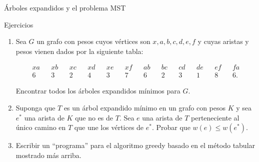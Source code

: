 \documentclass[11pt,spanish,makeidx]{amsbook}
\theoremstyle{definition}
\theoremstyle{remark}
\begin{document}
\begin{section}{Árboles expandidos y el problema MST}
\begin{subsection}{Ejercicios}
\begin{enumerate}
\item Sea $G$ un grafo con pesos cuyos vértices son $x,a,b,c,d,e,f$ y cuyas aristas y pesos vienen dados por la siguiente tabla:

\begin{align*}
xa &&xb &&xc &&xd &&xe &&xf &&ab &&bc &&cd &&de &&ef &&fa \\
6  &&3  &&2  &&4  &&3  &&7  &&6  &&2  &&3  &&1  &&8  &&6.
\end{align*}

Encontrar todos los árboles expandidos mínimos para $G$. \item Suponga que $T$ es un árbol expandido mínimo en un grafo con pesos $K$ y sea $e^*$ una arista de $K$ que no es de $T$. Sea $e$ una arista de $T$ perteneciente al único camino en $T$ que une los vértices de $e^*$. Probar que $w(e) \le w(e^*)$.
\item Escribir un ``programa'' para el algoritmo greedy basado en el método ta\-bu\-lar mostrado más arriba.

\end{enumerate}
\end{subsection}
\end{section}
\end{document}
